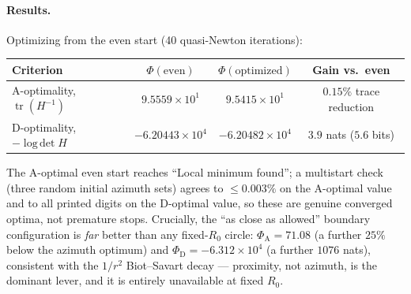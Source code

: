 \documentclass[11pt,a4paper]{article}
\newcommand{\tr}{\operatorname{tr}}
\newcommand{\logdet}{\operatorname{log\,det}}
\begin{document}
\paragraph{Results.} Optimizing from the even start (40 quasi-Newton iterations):
\begin{center}
\begin{tabular}{lccc}
\hline
Criterion & $\Phi(\text{even})$ & $\Phi(\text{optimized})$ & Gain vs.\ even \\
\hline
A-optimality, $\tr(H^{-1})$ & $9.5559\times10^{1}$ & $9.5415\times10^{1}$ & $0.15\%$ trace reduction \\
D-optimality, $-\logdet H$ & $-6.20443\times10^{4}$ & $-6.20482\times10^{4}$ & $3.9$ nats ($5.6$ bits) \\
\hline
\end{tabular}
\end{center}
The A-optimal even start reaches ``Local minimum found''; a multistart check (three random initial
azimuth sets) agrees to $\le\!0.003\%$ on the A-optimal value and to all printed digits on the
D-optimal value, so these are genuine converged optima, not premature stops. Crucially, the
``as close as allowed'' boundary configuration is \emph{far} better than any fixed-$R_0$ circle:
$\Phi_{\mathrm A}=71.08$ (a further $25\%$ below the azimuth optimum) and
$\Phi_{\mathrm D}=-6.312\times10^{4}$ (a further $1076$ nats), consistent with the $1/r^2$
Biot--Savart decay --- proximity, not azimuth, is the dominant lever, and it is entirely
unavailable at fixed $R_0$.
\end{document}
